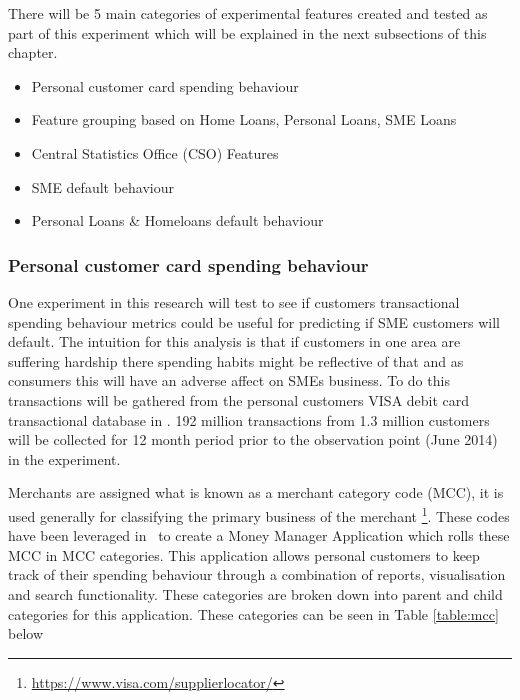 There will be 5 main categories of experimental features created and tested as part of this experiment which will be explained in the next subsections of this chapter. 

\begin{itemize}
	\item Personal customer card spending behaviour
	\item Feature grouping based on Home Loans, Personal Loans, SME Loans
	\item Central Statistics Office (CSO) Features
	\item SME default behaviour
	\item Personal Loans \& Homeloans default behaviour
\end{itemize}


\subsubsection{Personal customer card spending behaviour}
One experiment in this research will test to see if customers transactional spending behaviour metrics could be useful for predicting if SME customers will default. The intuition for this analysis is that if customers in one area are suffering hardship there spending habits might be reflective of that and as consumers this will have an adverse affect on SMEs business. To do this transactions will be gathered from the personal customers VISA debit card transactional database in \subjectname. 192 million transactions from 1.3 million customers  will be collected for 12 month period prior to the observation point (June 2014) in the experiment. 

Merchants are assigned what is known as a merchant category code (MCC), it is used generally for classifying the primary business of the merchant \footnote{\url{https://www.visa.com/supplierlocator/}}. These codes have been leveraged in \subjectname\ to create a Money Manager Application which rolls these MCC in MCC categories. This application allows personal customers to keep track of their spending behaviour through a combination of reports, visualisation and search functionality. These categories are broken down into parent and child categories for this application. These categories can be seen in Table \ref{table:mcc} below


